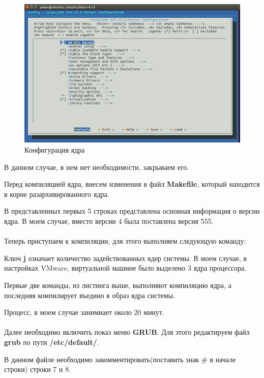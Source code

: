 \begin{figure}[H]
  \centering
  \includegraphics[width=\textwidth]{img/menuconfig}
  \caption{Конфигурация ядра}
\end{figure}

В данном случае, в нем нет необходимости, закрываем его.

Перед компиляцией ядра, внесем изменения в файл \textbf{Makefile}, который находится в корне разархивированного ядра.

В представленных первых 5 строках представлена основная информация о версии ядра. В моем случае, вместо версии 4 была поставлена версия 555.\\\\

Теперь приступаем к компиляции, для этого выполняем следующую команду:

Ключ \textbf{j} означает количество задействованных ядер системы. В моем случае, в настройках VMware, виртуальной машине было выделено 3 ядра процессора.

Первые две команды, из листинга выше, выполняют компиляцию ядра, а последняя компилирует въедино в образ ядра системы.

Процесс, в моем случае занимиает около 20 минут.\\\\
Далее необходимо включить показ меню \textbf{GRUB}. Для этого редактируем файл \textbf{grub} по пути \textbf{/etc/default/}.

В данном файле необходимо закомментировать(поставить знак \# в начале строки) строки 7 и 8.

